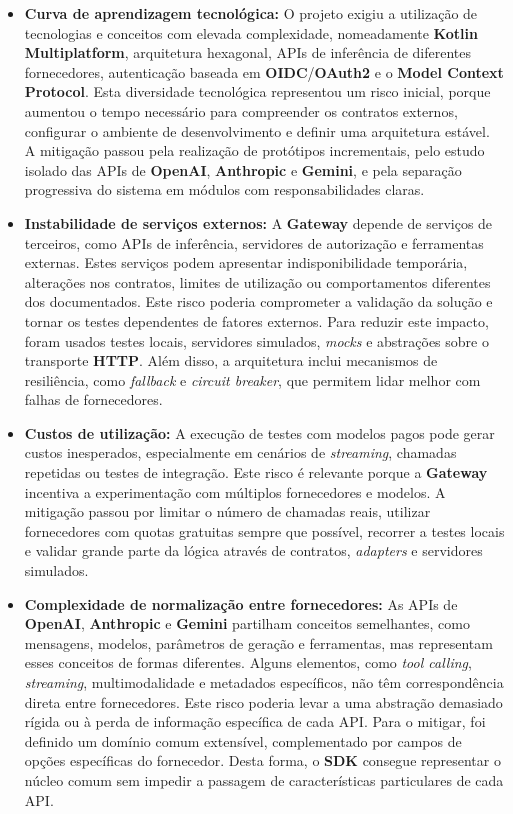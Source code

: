     \begin{itemize}
        \item \textbf{Curva de aprendizagem tecnológica:}
        O projeto exigiu a utilização de tecnologias e conceitos com elevada complexidade, nomeadamente \textbf{Kotlin Multiplatform}, arquitetura hexagonal, APIs de inferência de diferentes fornecedores, autenticação baseada em \textbf{OIDC}/\textbf{OAuth2} e o \textbf{Model Context Protocol}. Esta diversidade tecnológica representou um risco inicial, porque aumentou o tempo necessário para compreender os contratos externos, configurar o ambiente de desenvolvimento e definir uma arquitetura estável.
        A mitigação passou pela realização de protótipos incrementais, pelo estudo isolado das APIs de \textbf{OpenAI}, \textbf{Anthropic} e \textbf{Gemini}, e pela separação progressiva do sistema em módulos com responsabilidades claras.

        \item \textbf{Instabilidade de serviços externos:}
        A \textbf{Gateway} depende de serviços de terceiros, como APIs de inferência, servidores de autorização e ferramentas externas. Estes serviços podem apresentar indisponibilidade temporária, alterações nos contratos, limites de utilização ou comportamentos diferentes dos documentados. Este risco poderia comprometer a validação da solução e tornar os testes dependentes de fatores externos.
        Para reduzir este impacto, foram usados testes locais, servidores simulados, \textit{mocks} e abstrações sobre o transporte \textbf{HTTP}. Além disso, a arquitetura inclui mecanismos de resiliência, como \textit{fallback} e \textit{circuit breaker}, que permitem lidar melhor com falhas de fornecedores.

        \item \textbf{Custos de utilização:}
        A execução de testes com modelos pagos pode gerar custos inesperados, especialmente em cenários de \textit{streaming}, chamadas repetidas ou testes de integração. Este risco é relevante porque a \textbf{Gateway} incentiva a experimentação com múltiplos fornecedores e modelos.
        A mitigação passou por limitar o número de chamadas reais, utilizar fornecedores com quotas gratuitas sempre que possível, recorrer a testes locais e validar grande parte da lógica através de contratos, \textit{adapters} e servidores simulados.

        \item \textbf{Complexidade de normalização entre fornecedores:}
        As APIs de \textbf{OpenAI}, \textbf{Anthropic} e \textbf{Gemini} partilham conceitos semelhantes, como mensagens, modelos, parâmetros de geração e ferramentas, mas representam esses conceitos de formas diferentes. Alguns elementos, como \textit{tool calling}, \textit{streaming}, multimodalidade e metadados específicos, não têm correspondência direta entre fornecedores.
        Este risco poderia levar a uma abstração demasiado rígida ou à perda de informação específica de cada API. Para o mitigar, foi definido um domínio comum extensível, complementado por campos de opções específicas do fornecedor. Desta forma, o \textbf{SDK} consegue representar o núcleo comum sem impedir a passagem de características particulares de cada API.


\end{itemize}
